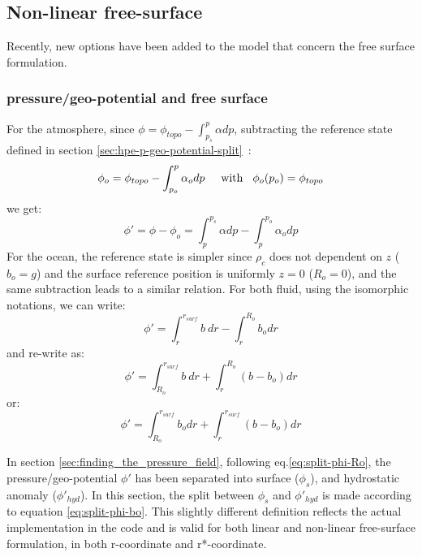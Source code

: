


\subsection{Non-linear free-surface}
\label{sec:nonlinear-freesurface}

Recently, new options have been added to the model
that concern the free surface formulation.


\subsubsection{pressure/geo-potential and free surface}
\label{sec:phi-freesurface}

For the atmosphere, since $\phi = \phi_{topo} - \int^p_{p_s} \alpha dp$,
subtracting the reference state defined in section
\ref{sec:hpe-p-geo-potential-split}~:\\
$$
\phi_o = \phi_{topo} - \int^p_{p_o} \alpha_o dp
\hspace{5mm}\mathrm{with}\hspace{3mm} \phi_o(p_o)=\phi_{topo}
$$
we get:
$$
\phi' = \phi - \phi_o = \int^{p_s}_p \alpha dp - \int^{p_o}_p \alpha_o dp
$$
For the ocean, the reference state is simpler since $\rho_c$ does not dependent
on $z$ ($b_o=g$) and the surface reference position is uniformly $z=0$ ($R_o=0$),
and the same subtraction leads to a similar relation.
For both fluid, using the isomorphic notations, we can write:
$$
\phi' = \int^{r_{surf}}_r b~ dr - \int^{R_o}_r b_o dr
$$
and re-write as:
\begin{equation}
\phi' = \int^{r_{surf}}_{R_o} b~ dr + \int^{R_o}_r (b - b_o) dr
\label{eq:split-phi-Ro}
\end{equation}
or:
\begin{equation}
\phi' = \int^{r_{surf}}_{R_o} b_o dr + \int^{r_{surf}}_r (b - b_o) dr
\label{eq:split-phi-bo}
\end{equation}

In section \ref{sec:finding_the_pressure_field}, following eq.\ref{eq:split-phi-Ro},
the pressure/geo-potential $\phi'$ has been separated into surface ($\phi_s$),
and hydrostatic anomaly ($\phi'_{hyd}$).
In this section, the split between $\phi_s$ and $\phi'_{hyd}$ is
made according to equation \ref{eq:split-phi-bo}. This slightly
different definition reflects the actual implementation in the code
and is valid for both linear and non-linear
free-surface formulation, in both r-coordinate and r*-coordinate.

